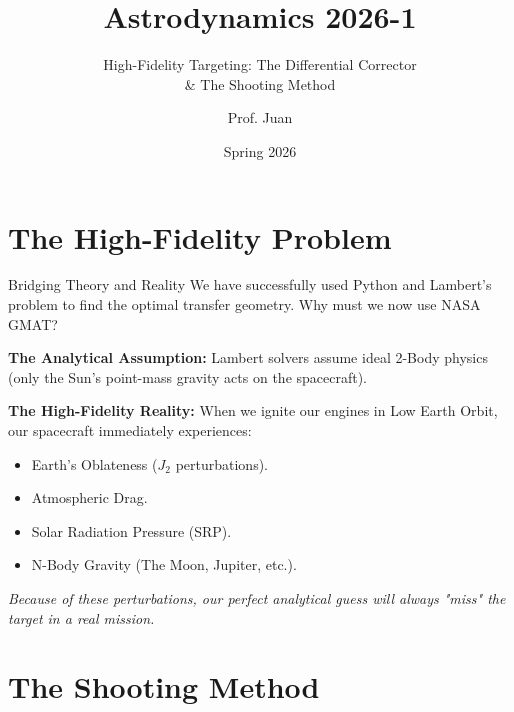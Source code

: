 \documentclass[11pt]{beamer}
\title[GMAT \& The Shooting Method]{Astrodynamics 2026-1}
\subtitle{High-Fidelity Targeting: The Differential Corrector \\ \& The Shooting Method}
\author{Prof. Juan}
\institute{Universidad de Antioquia - Aerospace Engineering}
\date{Spring 2026}
\begin{document}
\begin{frame}
    \titlepage
\end{frame}

\section{The High-Fidelity Problem}

\begin{frame}{Bridging Theory and Reality}
    We have successfully used Python and Lambert's problem to find the optimal transfer geometry. Why must we now use NASA GMAT?
    
    \vspace{0.3cm}
    \textbf{The Analytical Assumption:} Lambert solvers assume ideal 2-Body physics (only the Sun's point-mass gravity acts on the spacecraft).
    
    \vspace{0.3cm}
    \textbf{The High-Fidelity Reality:} When we ignite our engines in Low Earth Orbit, our spacecraft immediately experiences:
    \begin{itemize}
        \item Earth's Oblateness ($J_2$ perturbations).
        \item Atmospheric Drag.
        \item Solar Radiation Pressure (SRP).
        \item N-Body Gravity (The Moon, Jupiter, etc.).
    \end{itemize}
    \vspace{0.2cm}
    \textit{Because of these perturbations, our perfect analytical guess will always "miss" the target in a real mission.}
\end{frame}

\section{The Shooting Method}
\end{document}
